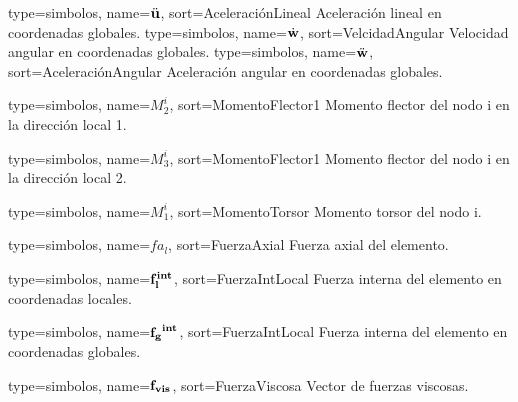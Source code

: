 {
	type={simbolos},
	name={$\ddot{\bf{u}}$}, %
	sort={AceleraciónLineal} %
}
{Aceleración lineal en coordenadas globales.}
{
	type={simbolos},
	name={$\dot{\bf{w}}$}, %
	sort={VelcidadAngular} %
}
{Velocidad angular en coordenadas globales.}
{
	type={simbolos},
	name={$\ddot{\bf{w}}$}, %
	sort={AceleraciónAngular} %
}
{Aceleración angular en coordenadas globales.}

{
	type={simbolos},
	name={$M^i_2$}, %
	sort={MomentoFlector1} %
}
{Momento flector del nodo i en la dirección local 1.}


{
	type={simbolos},
	name={$M^i_3$}, %
	sort={MomentoFlector1} %
}
{Momento flector del nodo i en la dirección local 2.}

{
	type={simbolos},
	name={$M^i_1$}, %
	sort={MomentoTorsor} %
}
{Momento torsor del nodo i.}


{
	type={simbolos},
	name={$fa_l$}, %
	sort={FuerzaAxial} %
}
{Fuerza axial del elemento.}

{
	type={simbolos},
	name={$\bf{ f_l^{int}}$}, %
	sort={FuerzaIntLocal} %
}
{Fuerza interna del elemento en coordenadas locales.}

{
	type={simbolos},
	name={$\bf{f_g}^{int}$}, %
	sort={FuerzaIntLocal} %
}
{Fuerza interna del elemento en coordenadas globales.}

{
	type={simbolos},
	name={$\bf{f_{vis}}$}, %
	sort={FuerzaViscosa} %
}
{Vector de fuerzas viscosas.}

